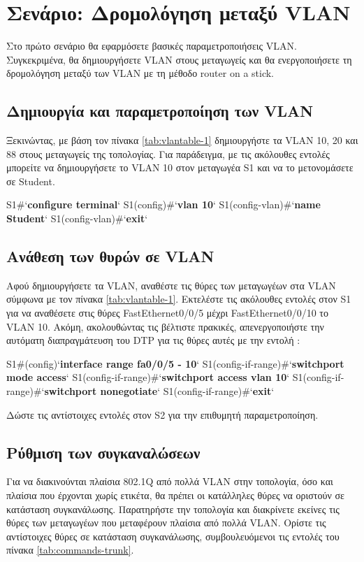 \documentclass{EdipyLabs} %
\begin{document}
\section{Σενάριο: Δρομολόγηση μεταξύ VLAN}
Στο πρώτο σενάριο θα εφαρμόσετε βασικές παραμετροποιήσεις VLAN. Συγκεκριμένα, θα δημιουργήσετε VLAN στους μεταγωγείς και θα ενεργοποιήσετε τη δρομολόγηση μεταξύ των VLAN με τη μέθοδο router on a stick.

\subsection{Δημιουργία και παραμετροποίηση των VLAN}

Ξεκινώντας, με βάση τον πίνακα \ref{tab:vlantable-1} δημιουργήστε τα VLAN 10, 20 και 88 στους μεταγωγείς της τοπολογίας. Για παράδειγμα, με τις ακόλουθες εντολές μπορείτε να δημιουργήσετε το VLAN 10 στον μεταγωγέα S1 και να το μετονομάσετε σε Student.

\begin{CommandBox}
S1#`\textbf{configure terminal}`
S1(config)#`\textbf{vlan 10}`
S1(config-vlan)#`\textbf{name Student}`
S1(config-vlan)#`\textbf{exit}`
\end{CommandBox}

\subsection{Ανάθεση των θυρών σε VLAN}

Αφού δημιουργήσετε τα VLAN, αναθέστε τις θύρες των μεταγωγέων στα VLAN σύμφωνα με τον πίνακα \ref{tab:vlantable-1}. Εκτελέστε τις ακόλουθες εντολές στον S1 για να αναθέσετε στις θύρες FastEthernet0/0/5 μέχρι FastEthernet0/0/10 το VLAN 10. Ακόμη, ακολουθώντας τις βέλτιστε πρακικές, απενεργοποιήστε την αυτόματη διαπραγμάτευση του DTP για τις θύρες αυτές με την εντολή : 

\begin{CommandBox}
S1#(config)`\textbf{interface range fa0/0/5 - 10}`
S1(config-if-range)#`\textbf{switchport mode access}`
S1(config-if-range)#`\textbf{switchport access vlan 10}`
S1(config-if-range)#`\textbf{switchport nonegotiate}`
S1(config-if-range)#`\textbf{exit}`
\end{CommandBox}

Δώστε τις αντίστοιχες εντολές στον S2 για την επιθυμητή παραμετροποίηση.


\subsection{Ρύθμιση των συγκαναλώσεων}
Για να διακινούνται πλαίσια 802.1Q από πολλά VLAN στην τοπολογία, όσο και πλαίσια που έρχονται χωρίς ετικέτα, θα πρέπει οι κατάλληλες θύρες να οριστούν σε κατάσταση συγκανάλωσης. Παρατηρήστε την τοπολογία και διακρίνετε εκείνες τις θύρες των μεταγωγέων που μεταφέρουν πλαίσια από πολλά VLAN. Ορίστε τις αντίστοιχες θύρες σε κατάσταση συγκανάλωσης, συμβουλευόμενοι τις εντολές του πίνακα \ref{tab:commands-trunk}.
\end{document}
